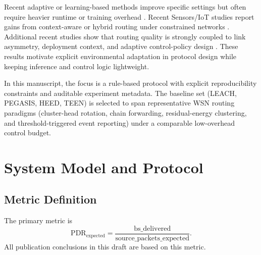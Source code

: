 ﻿\documentclass[sensors,article,submit,moreauthors,pdftex]{Definitions/mdpi}
\begin{document}
Recent adaptive or learning-based methods improve specific settings but often require heavier runtime or training overhead \cite{Ren2024,Okine2024,Chen2019Survey,Naeem2024DRL,Scientific2025DRLGNN,Nature2024NNILEACH,AI2025Survey,Manogaran2025DDQN,Tan2026MOGALSA}. Recent Sensors/IoT studies report gains from context-aware or hybrid routing under constrained networks \cite{ElFouly2023ILP,Dan2024EMRAR,Bhukya2025Hybrid,Kaddi2024GWOCSMA,Wang2024Geographic,Tariq2024A,Hassanien2025DLHEED,Ti2026HEOCP,Juwaied2025DEEC}. Additional recent studies show that routing quality is strongly coupled to link asymmetry, deployment context, and adaptive control-policy design \cite{Qin2024NLOSError,Jain2025Optimized,Ogundile2025PPRP,Singh2025Enhanced,Tossa2025Deployment,Prince2025Hotspot,Qin2026WBAN}. These results motivate explicit environmental adaptation in protocol design while keeping inference and control logic lightweight.

In this manuscript, the focus is a rule-based protocol with explicit reproducibility constraints and auditable experiment metadata.
The baseline set (LEACH, PEGASIS, HEED, TEEN) is selected to span representative WSN routing paradigms (cluster-head rotation, chain forwarding, residual-energy clustering, and threshold-triggered event reporting) under a comparable low-overhead control budget.

\section{System Model and Protocol}
\subsection{Metric Definition}
The primary metric is
\begin{equation}
\mathrm{PDR}_{\mathrm{expected}} = \frac{\mathrm{bs\_delivered}}{\mathrm{source\_packets\_expected}}.
\end{equation}
All publication conclusions in this draft are based on this metric.
\end{document}

